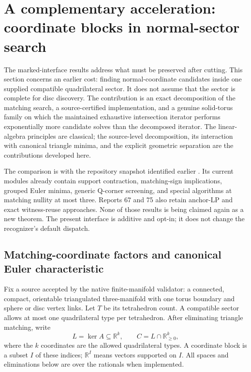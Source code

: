 \section{A complementary acceleration: coordinate blocks in normal-sector search}
\label{sec:sector-blocks}

The marked-interface results address what must be preserved after cutting.
This section concerns an earlier cost: finding normal-coordinate candidates
inside one supplied compatible quadrilateral sector.  It does not assume
that the sector is complete for disc discovery.  The contribution is an
exact decomposition of the matching search, a source-certified implementation,
and a genuine solid-torus family on which the maintained exhaustive
intersection iterator performs exponentially more candidate solves than the
decomposed iterator.  The linear-algebra principles are classical; the
source-level decomposition, its interaction with canonical triangle minima,
and the explicit geometric separation are the contributions developed here.

The comparison is with the repository snapshot identified earlier
\cite{ProveIt2026}.  Its current modules already contain support contraction,
matching-sign implications, grouped Euler minima, generic Q-corner screening,
and special algorithms at matching nullity at most three.  Reports 67 and 75
also retain anchor-LP and exact witness-reuse approaches.  None of those
results is being claimed again as a new theorem.  The present interface is
additive and opt-in; it does not change the recognizer's default dispatch.

\subsection{Matching-coordinate factors and canonical Euler characteristic}

Fix a source accepted by the native finite-manifold validator: a connected,
compact, orientable triangulated three-manifold with one torus boundary and
sphere or disc vertex links.  Let $T$ be its tetrahedron count.  A compatible
sector allows at most one quadrilateral type per tetrahedron.  After
eliminating triangle matching, write
\[
 L=\ker A\subseteq\mathbb R^k,\qquad
 C=L\cap\mathbb R_{\geq0}^k,
\]
where the $k$ coordinates are the allowed quadrilateral types.  A coordinate
block is a subset $I$ of these indices; $\mathbb R^I$ means vectors supported
on $I$.  All spaces and eliminations below are over the rationals when
implemented.

